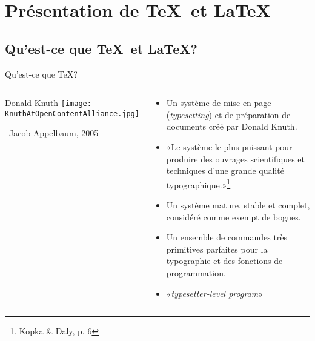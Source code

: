\small

\section{Présentation de \TeX\ et \LaTeX}

\subsection{Qu'est-ce que \TeX\ et \LaTeX?}

\begin{frame}{Qu'est-ce que \TeX?}
	\begin{columns}
		\begin{HEClegende}{Donald Knuth}
			\texttt{[image: KnuthAtOpenContentAlliance.jpg]}
			
			{\tiny\faCreativeCommons\ Jacob Appelbaum, 2005}
		\end{HEClegende}
		\begin{HECcontenuLegende}
			\begin{itemize}
				\item Un système de mise en page (\emph{typesetting}) et de préparation de documents
				créé par Donald Knuth.
				\item «Le système le plus puissant pour produire des ouvrages scientifiques et
				techniques d'une grande qualité typographique.»\footnote{Kopka \& Daly, p. 6}
				\item Un système mature, stable et complet, considéré comme exempt de bogues.
				\item Un ensemble de commandes très primitives parfaites pour la typographie et
				des fonctions de programmation.
				\item «\emph{typesetter-level program}»
			\end{itemize}
		\end{HECcontenuLegende}
	\end{columns}
\end{frame}


